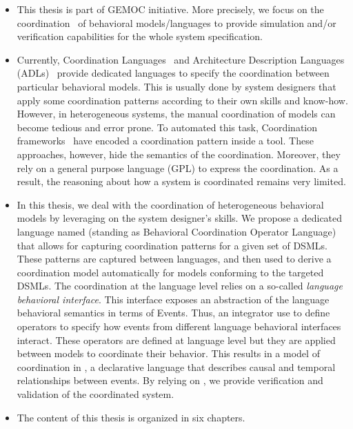 \begin{itemize}
	\item This thesis is part of GEMOC initiative. More precisely, we focus on the coordination~\cite{coordsignibib} of behavioral models/languages to provide simulation and/or verification capabilities for the whole system specification. 
	
	
	\item Currently, Coordination Languages~\cite{coordsignibib} and Architecture Description Languages (ADLs)~\cite{frameadlsbib} provide dedicated languages to specify the coordination between particular behavioral models. This is usually done by system designers that apply some coordination patterns according to their own skills and know-how. However, in heterogeneous systems, the manual coordination of models can become tedious and error prone. To automated this task, Coordination frameworks~\cite{ptoleframebib,modhelxbib} have encoded a coordination pattern inside a tool. These approaches, however, hide the semantics of the coordination. Moreover, they rely on a general purpose language (GPL) to express the coordination. As a result, the reasoning about how a system is coordinated remains very limited.  
	
\item In this thesis, we deal with the coordination of heterogeneous behavioral models by leveraging on the system designer's skills. We propose a dedicated language named \bcool (standing as Behavioral Coordination Operator Language) that allows for capturing coordination patterns for a given set of DSMLs. These patterns are captured between languages, and then used to derive a coordination model automatically for models conforming to the targeted DSMLs. The coordination at the language level relies on a so-called \emph{language behavioral interface}. This interface exposes an abstraction of the language behavioral semantics in terms of Events. Thus, an integrator use \bcool to define operators to specify how events from different language behavioral interfaces interact. These operators are defined at language level but they are applied between models to coordinate their behavior. This results in a model of coordination in \ccsl, a declarative language that describes causal and temporal relationships between events. By relying on \ccsl, we provide verification and validation of the coordinated system.    

\item The content of this thesis is organized  in six chapters. 


\end{itemize}
